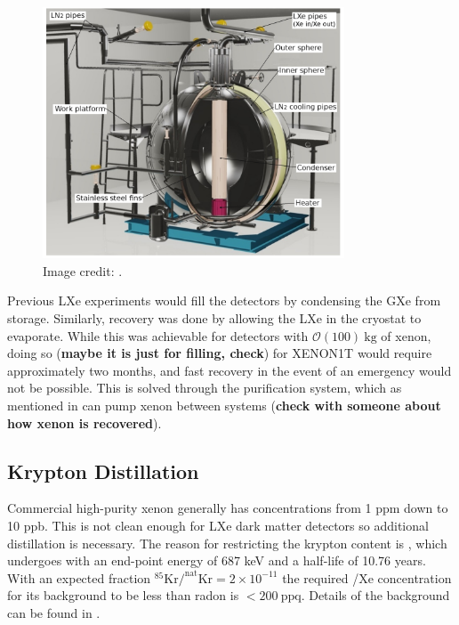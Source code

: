 \begin{figure}
\centering
\includegraphics[width=0.8\textwidth]{ReStoX}
\caption{Image credit: .}
\label{fig:xenon1t_restox_pic}
\end{figure}

Previous LXe experiments would fill the detectors by condensing the GXe from storage.  Similarly, recovery was done by allowing the LXe
in the cryostat to evaporate.  While this was achievable for detectors with $\mathcal{O}(100)\ \mathrm{kg}$ of xenon, doing so
(\textbf{maybe it is just for filling, check}) for XENON1T would require approximately two months, and fast recovery in the event of an
emergency would not be possible.  This is solved through the purification system, which as mentioned in  can
pump xenon between systems (\textbf{check with someone about how xenon is recovered}).



\subsection{Krypton Distillation}
\label{subsec:xenon1t_kr_dist}
Commercial high-purity xenon generally has  concentrations from 1 ppm down to 10 ppb.  This is not clean enough for LXe dark matter
detectors so additional distillation is necessary.  The reason for restricting the
krypton content is , which undergoes \betadecay with an end-point energy of 687 keV and a half-life of 10.76 years.  With
an expected fraction $\mathrm{^{85}Kr / ^{nat}Kr = 2 \times 10^{-11}}$ the required /Xe concentration for its background to be
less than radon is $< 200\ \mathrm{ppq}$.  Details of the  background can be found in .

